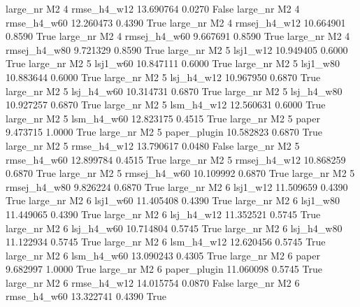   large_nr       M2                 4  rmse_h4_w12   13.690764      0.0270   False
  large_nr       M2                 4  rmse_h4_w60   12.260473      0.4390    True
  large_nr       M2                 4 rmsej_h4_w12   10.664901      0.8590    True
  large_nr       M2                 4 rmsej_h4_w60    9.667691      0.8590    True
  large_nr       M2                 4 rmsej_h4_w80    9.721329      0.8590    True
  large_nr       M2                 5     lsj1_w12   10.949405      0.6000    True
  large_nr       M2                 5     lsj1_w60   10.847111      0.6000    True
  large_nr       M2                 5     lsj1_w80   10.883644      0.6000    True
  large_nr       M2                 5   lsj_h4_w12   10.967950      0.6870    True
  large_nr       M2                 5   lsj_h4_w60   10.314731      0.6870    True
  large_nr       M2                 5   lsj_h4_w80   10.927257      0.6870    True
  large_nr       M2                 5   lsm_h4_w12   12.560631      0.6000    True
  large_nr       M2                 5   lsm_h4_w60   12.823175      0.4515    True
  large_nr       M2                 5        paper    9.473715      1.0000    True
  large_nr       M2                 5 paper_plugin   10.582823      0.6870    True
  large_nr       M2                 5  rmse_h4_w12   13.790617      0.0480   False
  large_nr       M2                 5  rmse_h4_w60   12.899784      0.4515    True
  large_nr       M2                 5 rmsej_h4_w12   10.868259      0.6870    True
  large_nr       M2                 5 rmsej_h4_w60   10.109992      0.6870    True
  large_nr       M2                 5 rmsej_h4_w80    9.826224      0.6870    True
  large_nr       M2                 6     lsj1_w12   11.509659      0.4390    True
  large_nr       M2                 6     lsj1_w60   11.405408      0.4390    True
  large_nr       M2                 6     lsj1_w80   11.449065      0.4390    True
  large_nr       M2                 6   lsj_h4_w12   11.352521      0.5745    True
  large_nr       M2                 6   lsj_h4_w60   10.714804      0.5745    True
  large_nr       M2                 6   lsj_h4_w80   11.122934      0.5745    True
  large_nr       M2                 6   lsm_h4_w12   12.620456      0.5745    True
  large_nr       M2                 6   lsm_h4_w60   13.090243      0.4305    True
  large_nr       M2                 6        paper    9.682997      1.0000    True
  large_nr       M2                 6 paper_plugin   11.060098      0.5745    True
  large_nr       M2                 6  rmse_h4_w12   14.015754      0.0870   False
  large_nr       M2                 6  rmse_h4_w60   13.322741      0.4390    True
